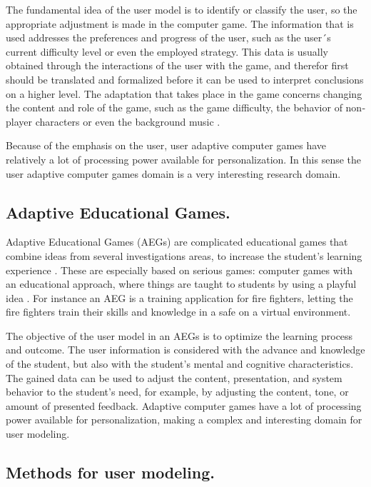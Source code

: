 The fundamental idea of the user model is to identify or classify the user, so
the appropriate adjustment is made in the computer game. The information that is
used addresses the preferences and progress of the user, such as the user´s
current  difficulty level or even the employed strategy. This data is usually
obtained through the interactions of  the user with the game, and therefor first
should be translated and formalized  before it can be  used to interpret
conclusions on a higher level. The adaptation that takes place in the game
concerns changing the content and role of the  game, such as the game
difficulty, the behavior of non‐player characters  or even the background  music
\cite{bakkes2012personalised}.

Because of the emphasis on the user, user adaptive computer games have
relatively a lot of processing power available  for personalization. In this
sense the user adaptive computer games domain is a very interesting research
domain.



\subsection{Adaptive Educational Games.}

Adaptive Educational Games (AEGs) are complicated educational games that combine
ideas from several investigations areas, to increase the student’s learning
experience \cite{peeters2012situated}. These are especially based on  serious
games: computer games with an educational approach, where things are taught to
students by using a  playful idea \cite{korteling2011transfer} \cite{johnson2005serious}.
For instance an AEG is a training application  for fire fighters, letting
the fire fighters train their skills and knowledge in a safe on a virtual
environment.

The objective of the user model in an AEGs is to optimize the learning process
and outcome.   The user information is considered with the advance and knowledge
of the student, but also with the  student’s mental and cognitive
characteristics. The gained data can be used to adjust the content,
presentation, and system behavior to the  student’s need, for example, by
adjusting the content, tone, or amount of presented feedback. Adaptive computer
games have a lot of processing power available for personalization,  making a
complex and interesting domain for user modeling.

\subsection{Methods for user modeling.}

